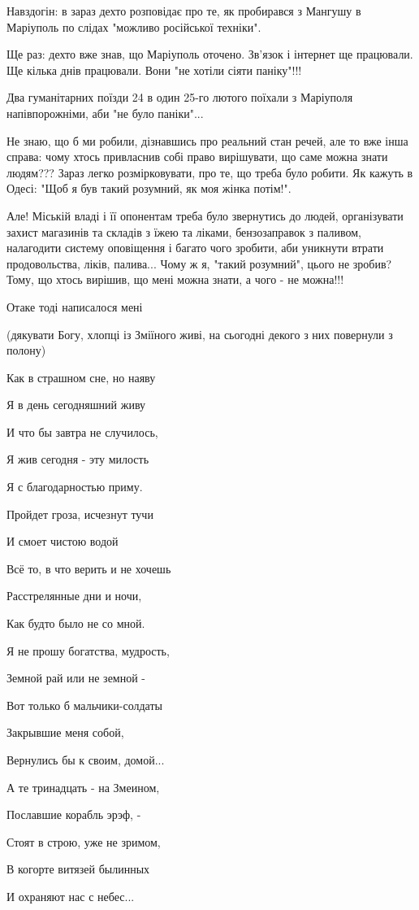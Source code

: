 Навздогін: в зараз дехто розповідає про те, як пробирався з Мангушу в Маріуполь
по слідах "можливо російської техніки".

Ще раз: дехто вже знав, що Маріуполь оточено. Зв'язок і інтернет ще працювали.
Ще кілька днів працювали. Вони "не хотіли сіяти паніку"!!!

Два гуманітарних поїзди 24 в один 25-го лютого поїхали з Маріуполя
напівпорожніми, аби "не було паніки"...

 Не знаю, що б ми робили, дізнавшись про реальний стан речей, але то вже інша
 справа: чому хтось привласнив собі право вирішувати, що саме можна знати
 людям??? Зараз легко розмірковувати, про те, що треба було робити. Як кажуть в
 Одесі: "Щоб я був такий розумний, як моя жінка потім!".

Але! Міській владі і її опонентам треба було звернутись до людей, організувати
захист магазинів та складів з їжею та ліками, бензозаправок з паливом,
налагодити систему оповіщення і багато чого зробити, аби уникнути втрати
продовольства, ліків, палива... Чому ж я, "такий розумний", цього не зробив?
Тому, що хтось вирішив, що мені можна знати, а чого - не можна!!!

Отаке тоді написалося мені

(дякувати Богу,  хлопці із Зміїного живі, на сьогодні декого з них повернули з
полону)

Как в страшном сне, но наяву

Я в день сегодняшний живу

И что бы завтра не случилось,

Я жив сегодня - эту милость

Я с благодарностью приму.

Пройдет гроза, исчезнут тучи

И смоет чистою водой

Всё то, в что верить и не хочешь

Расстрелянные дни и ночи,

Как будто было не со мной.

Я не прошу богатства, мудрость,

Земной рай или не земной -

Вот только б мальчики-солдаты

Закрывшие меня собой,

Вернулись бы к своим, домой...

А те тринадцать - на Змеином,

Пославшие корабль эрэф, -

Стоят в строю, уже не зримом,

В когорте витязей былинных

И охраняют нас с небес...
